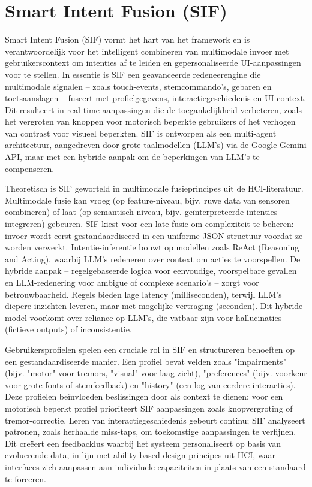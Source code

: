 \documentclass[openany]{book}
\begin{document}
\section*{Smart Intent Fusion (SIF)}
Smart Intent Fusion (SIF) vormt het hart van het framework en is verantwoordelijk voor het intelligent combineren van multimodale invoer met gebruikerscontext om intenties af te leiden en gepersonaliseerde UI-aanpassingen voor te stellen. In essentie is SIF een geavanceerde redeneerengine die multimodale signalen – zoals touch-events, stemcommando's, gebaren en toetsaanslagen – fuseert met profielgegevens, interactiegeschiedenis en UI-context. Dit resulteert in real-time aanpassingen die de toegankelijkheid verbeteren, zoals het vergroten van knoppen voor motorisch beperkte gebruikers of het verhogen van contrast voor visueel beperkten. SIF is ontworpen als een multi-agent architectuur, aangedreven door grote taalmodellen (LLM's) via de Google Gemini API, maar met een hybride aanpak om de beperkingen van LLM's te compenseren.

Theoretisch is SIF geworteld in multimodale fusieprincipes uit de HCI-literatuur. Multimodale fusie kan vroeg (op feature-niveau, bijv. ruwe data van sensoren combineren) of laat (op semantisch niveau, bijv. geïnterpreteerde intenties integreren) gebeuren. SIF kiest voor een late fusie om complexiteit te beheren: invoer wordt eerst gestandaardiseerd in een uniforme JSON-structuur voordat ze worden verwerkt. Intentie-inferentie bouwt op modellen zoals ReAct (Reasoning and Acting), waarbij LLM's redeneren over context om acties te voorspellen. De hybride aanpak – regelgebaseerde logica voor eenvoudige, voorspelbare gevallen en LLM-redenering voor ambigue of complexe scenario's – zorgt voor betrouwbaarheid. Regels bieden lage latency (milliseconden), terwijl LLM's diepere inzichten leveren, maar met mogelijke vertraging (seconden). Dit hybride model voorkomt over-reliance op LLM's, die vatbaar zijn voor hallucinaties (fictieve outputs) of inconsistentie.

Gebruikersprofielen spelen een cruciale rol in SIF en structureren behoeften op een gestandaardiseerde manier. Een profiel bevat velden zoals "impairments" (bijv. "motor" voor tremors, "visual" voor laag zicht), "preferences" (bijv. voorkeur voor grote fonts of stemfeedback) en "history" (een log van eerdere interacties). Deze profielen beïnvloeden beslissingen door als context te dienen: voor een motorisch beperkt profiel prioriteert SIF aanpassingen zoals knopvergroting of tremor-correctie. Leren van interactiegeschiedenis gebeurt continu; SIF analyseert patronen, zoals herhaalde miss-taps, om toekomstige aanpassingen te verfijnen. Dit creëert een feedbacklus waarbij het systeem personaliseert op basis van evoluerende data, in lijn met ability-based design principes uit HCI, waar interfaces zich aanpassen aan individuele capaciteiten in plaats van een standaard te forceren.
\end{document}
